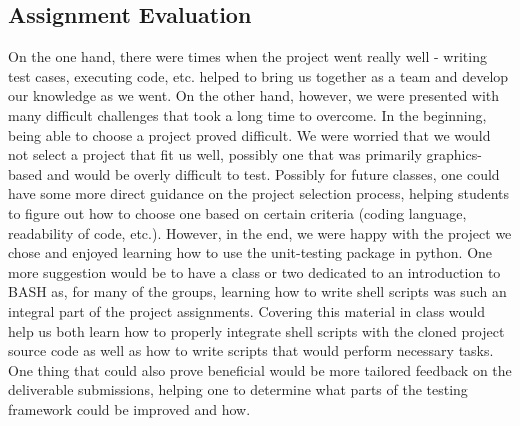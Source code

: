 \documentclass{article}
\begin{document}
\subsection{Assignment Evaluation}
On the one hand, there were times when the project went really well - writing test cases, executing code, etc. helped to bring us together as a team and develop our knowledge as we went. On the other hand, however, we were presented with many difficult challenges that took a long time to overcome. In the beginning, being able to choose a project proved difficult. We were worried that we would not select a project that fit us well, possibly one that was primarily graphics-based and would be overly difficult to test. Possibly for future classes, one could have some more direct guidance on the project selection process, helping students to figure out how to choose one based on certain criteria (coding language, readability of code, etc.). However, in the end, we were happy with the project we chose and enjoyed learning how to use the unit-testing package in python. One more suggestion would be to have a class or two dedicated to an introduction to BASH as, for many of the groups, learning how to write shell scripts was such an integral part of the project assignments. Covering this material in class would help us both learn how to properly integrate shell scripts with the cloned project source code as well as how to write scripts that would perform necessary tasks. One thing that could also prove beneficial would be more tailored feedback on the deliverable submissions, helping one to determine what parts of the testing framework could be improved and how.
\end{document}
